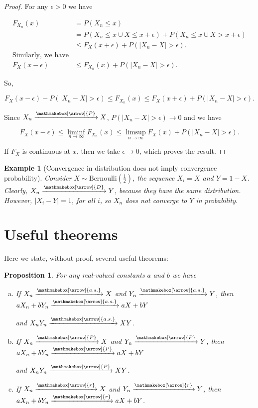 \documentclass{book}
\theoremstyle{plain}%
\newtheorem{prototheorem}{Example}[section]
\newenvironment{cexample}
   {\colorlet{shadecolor}{gray!10}\begin{shaded}\begin{prototheorem}}
   {\end{prototheorem}\end{shaded}}
\newtheorem{proposition}{Proposition}[section]
\theoremstyle{definition}
\newlength{\arrow}
\newcommand*{\myrightarrow}[1]{\xrightarrow{\mathmakebox[\arrow]{#1}}}
\begin{document}
\begin{proof}

For any $\epsilon > 0$ we have

\begin{align*}
F_{X_n}(x) &= P(X_n \leq x) \\
&= P(X_n \leq x \cup X \leq x + \epsilon) + P(X_n \leq x \cup X > x + \epsilon) \\
&\leq F_X(x + \epsilon) + P(|X_n - X| > \epsilon). \\
\text{Similarly, we have} & \\
F_{X}(x - \epsilon) &\leq F_{X_n}(x) + P(|X_n - X| > \epsilon).
\end{align*}

So,

$$F_{X}(x - \epsilon) - P(|X_n - X| > \epsilon) \leq F_{X_n}(x) \leq F_X(x + \epsilon) + P(|X_n - X| > \epsilon).$$

Since $X_n \myrightarrow{P} X$, $P(|X_n - X| > \epsilon) \rightarrow 0$ and we have

$$F_{X}(x - \epsilon) \leq \liminf_{n \rightarrow \infty} F_{X_n}(x) \leq \limsup_{n \rightarrow \infty} F_X(x) + P(|X_n - X| > \epsilon).$$

If $F_X$ is continuous at $x$, then we take $\epsilon \rightarrow 0$, which proves the result.
\end{proof}

\begin{cexample}[Convergence in distribution does not imply convergence probability]
Consider $X \sim \text{Bernoulli}(\frac{1}{2})$, the sequence $X_i = X$ and $Y = 1 - X$. Clearly, $X_n \myrightarrow{D} Y$, because they have the same distribution. However, $|X_i - Y| = 1$, for all $i$, so $X_n$ does not converge to $Y$ in probability.
\end{cexample}

\section{Useful theorems}

Here we state, without proof, several useful theorems:

\begin{proposition}

For any real-valued constants $a$ and $b$ we have

\begin{enumerate}[(a)]
\item If $X_n \myrightarrow{a.s.} X$ and $Y_n \myrightarrow{a.s.} Y$, then $aX_n + bY_n \myrightarrow{a.s.} aX + bY$ 

and $X_nY_n \myrightarrow{a.s.} XY$.
\item If $X_n \myrightarrow{P} X$ and $Y_n \myrightarrow{P} Y$, then $aX_n + bY_n \myrightarrow{P} aX + bY$

and $X_nY_n \myrightarrow{P} XY$.
\item If $X_n \myrightarrow{r} X$ and $Y_n \myrightarrow{r} Y$, then $aX_n + bY_n \myrightarrow{r} aX + bY$.
\end{enumerate}
\end{proposition}
\end{document}
